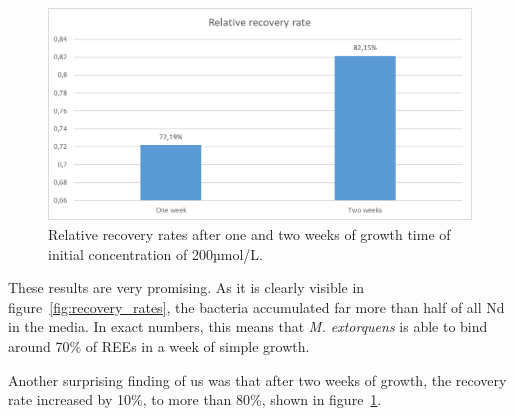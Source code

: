 \begin{figure}[H]
    \centering
    \includegraphics[width=1\textwidth]{media/images/recovery_rates_relative}
    \caption{Relative recovery rates after one and two weeks of growth time of initial concentration of 200µmol/L.}
    \label{fig:relative_rec_rates}
\end{figure}

These results are very promising.
As it is clearly visible in figure~\ref{fig:recovery_rates}, the bacteria accumulated far more than half of all Nd in the media.
In exact numbers, this means that \emph{M. extorquens} is able to bind around 70\% of REEs in a week of simple growth.

Another surprising finding of us was that after two weeks of growth, the recovery rate increased by 10\%, to more than 80\%, shown in figure~\ref{fig:relative_rec_rates}.


